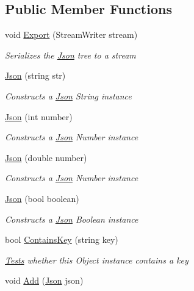 \subsection*{Public Member Functions}
\begin{DoxyCompactItemize}
\item 
void \mbox{\hyperlink{class_eagle_eye_1_1_models_1_1_json_ad911e1ca9e6ba8a8ae4c85152593c691}{Export}} (Stream\+Writer stream)
\begin{DoxyCompactList}\small\item\em Serializes the \mbox{\hyperlink{class_eagle_eye_1_1_models_1_1_json}{Json}} tree to a stream \end{DoxyCompactList}\item 
\mbox{\hyperlink{class_eagle_eye_1_1_models_1_1_json_ad5ccac28bacaf78710b8d7fb73911426}{Json}} (string str)
\begin{DoxyCompactList}\small\item\em Constructs a \mbox{\hyperlink{class_eagle_eye_1_1_models_1_1_json}{Json}} String instance \end{DoxyCompactList}\item 
\mbox{\hyperlink{class_eagle_eye_1_1_models_1_1_json_a2b753342c141001d4d8ba07c2040728f}{Json}} (int number)
\begin{DoxyCompactList}\small\item\em Constructs a \mbox{\hyperlink{class_eagle_eye_1_1_models_1_1_json}{Json}} Number instance \end{DoxyCompactList}\item 
\mbox{\hyperlink{class_eagle_eye_1_1_models_1_1_json_aeab0ffd54a14d95ef7a275f665ef6d0c}{Json}} (double number)
\begin{DoxyCompactList}\small\item\em Constructs a \mbox{\hyperlink{class_eagle_eye_1_1_models_1_1_json}{Json}} Number instance \end{DoxyCompactList}\item 
\mbox{\hyperlink{class_eagle_eye_1_1_models_1_1_json_ae12564ad6ef249ccd5bbdd57560db23d}{Json}} (bool boolean)
\begin{DoxyCompactList}\small\item\em Constructs a \mbox{\hyperlink{class_eagle_eye_1_1_models_1_1_json}{Json}} Boolean instance \end{DoxyCompactList}\item 
bool \mbox{\hyperlink{class_eagle_eye_1_1_models_1_1_json_a140f24f32b5b39c66584f13eb2fbf586}{Contains\+Key}} (string key)
\begin{DoxyCompactList}\small\item\em \mbox{\hyperlink{namespace_eagle_eye_1_1_tests}{Tests}} whether this Object instance contains a key \end{DoxyCompactList}\item 
void \mbox{\hyperlink{class_eagle_eye_1_1_models_1_1_json_a4b23b3ec238276219d3d953b385fac93}{Add}} (\mbox{\hyperlink{class_eagle_eye_1_1_models_1_1_json}{Json}} json)
\end{DoxyCompactItemize}

